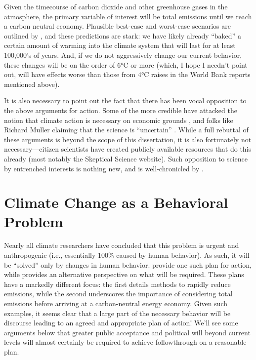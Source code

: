 Given the timecourse of carbon dioxide and other greenhouse gases in the
atmosphere, the primary variable of interest will be total emissions until we
reach a carbon neutral economy. Plausible best-case and worst-case scenarios are
outlined by \textcite{archer_millennial_2008}, and these predictions are stark:
we have likely already “baked” a certain amount of warming into the climate
system that will last for at least 100,000's of years. And, if we do not
aggressively change our current behavior, these changes will be on the order of
6°C or more (which, I hope I needn't point out, will have effects worse than
those from 4°C raises in the World Bank reports mentioned above).

It is also necessary to point out the fact that there has been vocal opposition
to the above arguments for action. Some of the more credible have attacked the
notion that climate action is necessary on economic grounds
\parencite[e.g.,][]{lomborg_cool_2007}, and folks like Richard Muller claiming
that the science is “uncertain” \parencite[recanted by his own initiative
in][]{rohde_new_2013}. While a full rebuttal of these arguments is beyond the
scope of this dissertation, it is also fortunately not necessary---citizen
scientists have created publicly available resources that do this already (most
notably the Skeptical Science website). Such opposition to science by
entrenched interests is nothing new, and is well-chronicled by
\textcite{oreskes_merchants_2010}.

\section{Climate Change as a Behavioral Problem}

Nearly all climate researchers have concluded that this problem is urgent and
anthropogenic (i.e., essentially 100\% caused by human behavior). As such, it
will be ``solved'' only by changes in human behavior. \textcite{harte_cool_2008}
provide one such plan for action, while \textcite{schrag_hope_2011} provides an
alternative perspective on what will be required. These plans have a markedly
different focus: the first details methods to rapidly reduce emissions, while
the second underscores the importance of considering total emissions before
arriving at a carbon-neutral energy economy. Given such examples, it seems clear
that a large part of the necessary behavior will be discourse leading to an
agreed and appropriate plan of action! We'll see some arguments below that
greater  public acceptance and political will beyond current levels will almost
certainly be required to achieve followthrough on a reasonable plan.

